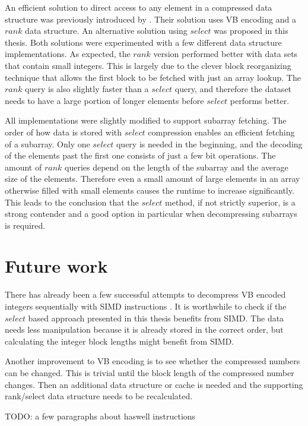 An efficient solution to direct access to any element in a compressed data structure was previously introduced by \citeauthor{Bri09}. Their solution uses VB encoding and a $rank$ data structure. 
An alternative solution using $select$ was proposed in this thesis. Both solutions were experimented with a few different data structure implementations. As expected, the $rank$ version performed better with data sets that contain small integers. This is largely due to the 
clever block reorganizing technique that allows the first block to be fetched with just an array lookup. The $rank$ query is also slightly faster than a $select$ query, and therefore the dataset needs 
to have a large portion of longer elements before $select$ performs better. 

All implementations were slightly modified to support subarray fetching. The order of how data is stored with $select$ compression enables an efficient fetching of a subarray. Only one $select$ query 
is needed in the beginning, and the decoding of the elements past the first one consists of just a few bit operations. The amount of $rank$ queries depend on the length of the subarray and the average 
size of the elements. Therefore even a small amount of large elements in an array otherwise filled with small elements causes the runtime to increase significantly. This leads to the conclusion that the $select$ method, 
if not strictly superior, is a strong contender and a good option in particular when decompressing subarrays is required.

\section{Future work}
There has already been a few successful attempts to decompress VB encoded integers sequentially with SIMD instructions \citep{Lem18,Pla15}. It is worthwhile to check if the $select$ based approach presented 
in this thesis benefits from SIMD. The data needs less manipulation because it is already stored in the correct order, but calculating the integer block lengths might benefit from SIMD.

Another improvement to VB encoding is to see whether the compressed numbers can be changed. This is trivial until the block length of the compressed number changes. Then an additional data structure or 
cache is needed and the supporting rank/select data structure needs to be recalculated.

TODO: a few paragraphs about haswell instructions
